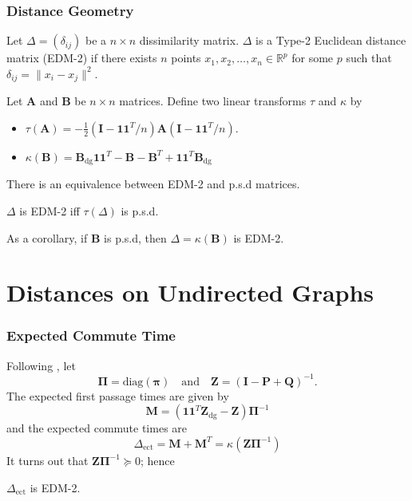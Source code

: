 \documentclass[professionalfonts, hyperref={pdfpagelabels=false,
  colorlinks=true, linkcolor=purple}]{beamer}
\begin{document}
\begin{frame}
  \frametitle{Distance Geometry}
  \begin{definition}
    \label{def:2}
    Let $\Delta = (\delta_{ij})$ be a $n \times n$ dissimilarity
    matrix. $\Delta$ is a Type-2 Euclidean distance matrix
    (\alert{EDM-2}) if there exists $n$ points $x_1, x_2, \dots, x_n
    \in \mathbb{R}^{p}$ for some $p$ such that $\delta_{ij} = \| x_i -
    x_j \|^2$.
  \end{definition}
  Let $\mathbf{A}$ and $\mathbf{B}$ be $n \times n$ matrices. Define two
  linear transforms $\tau$ and $\kappa$ by 
  \begin{itemize}
  \item $\tau(\mathbf{A}) = -\tfrac{1}{2} (\mathbf{I} -
    \mathbf{1}\mathbf{1}^{T}/n) \mathbf{A} (\mathbf{I} -
    \mathbf{1}\mathbf{1}^{T}/n)$.
  \item $\kappa(\mathbf{B}) =
    \mathbf{B}_{\mathrm{dg}}\mathbf{1}\mathbf{1}^{T} - \mathbf{B}
    - \mathbf{B}^{T} + \mathbf{1}\mathbf{1}^{T} \mathbf{B}_{\mathrm{dg}}$
  \end{itemize}
  There is an equivalence between EDM-2 and p.s.d matrices.
  \begin{theorem}
    \label{thm:1}
    $\Delta$ is EDM-2 iff $\tau(\Delta)$ is p.s.d.
  \end{theorem}
  As a corollary, if $\mathbf{B}$ is p.s.d, then
  $\Delta = \kappa(\mathbf{B})$ is EDM-2.
\end{frame}
\section{Distances on Undirected Graphs}
\begin{frame}
  \frametitle{Expected Commute Time}
  Following \cite{kemeny83:_finit_markov_chain}, let
  \begin{equation*}
    \bm{\Pi} = \mathrm{diag}(\bm{\pi}) \quad \text{and} \quad
    \mathbf{Z} = (\mathbf{I} - \mathbf{P} + \mathbf{Q})^{-1}.
  \end{equation*}
  The expected first passage times are given by
  \begin{equation*}
    \mathbf{M} = (\mathbf{1}\mathbf{1}^{T}\mathbf{Z}_{\mathrm{dg}} -
    \mathbf{Z})\bm{\Pi}^{-1} 
  \end{equation*}
  and the expected commute times are
  \begin{equation*}
    \Delta_{\mathrm{ect}} = \mathbf{M} + \mathbf{M}^{T} =
    \kappa(\mathbf{Z}\bm{\Pi}^{-1})
  \end{equation*}
  It turns out that $\mathbf{Z}\bm{\Pi}^{-1} \succeq
  0$; hence 

  \vskip10pt \alert{$\Delta_{\mathrm{ect}}$ is EDM-2}.
\end{frame}
\end{document}
